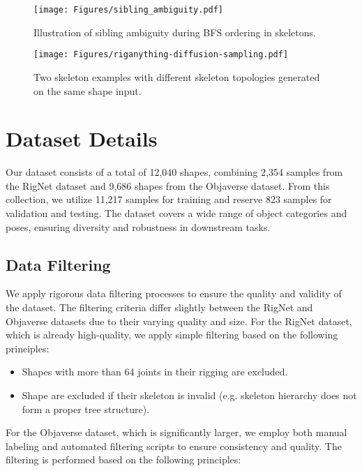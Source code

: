 \begin{figure}[h]
\texttt{[image: Figures/sibling\_ambiguity.pdf]}
\caption{Illustration of sibling ambiguity during BFS ordering in skeletons.}
\label{fig:sibling_ambiguity}
\end{figure}



\begin{figure}[h]
\texttt{[image: Figures/riganything-diffusion-sampling.pdf]}
\caption{Two skeleton examples with different skeleton topologies generated on the same shape input.}
\label{fig: diffusion_sampling}
\end{figure}

\section{Dataset Details}

Our dataset consists of a total of 12,040 shapes, combining 2,354 samples from the RigNet dataset and 9,686 shapes from the Objaverse dataset. From this collection, we utilize 11,217 samples for training and reserve 823 samples for validation and testing. The dataset covers a wide range of object categories and poses, ensuring diversity and robustness in downstream tasks.

\subsection{Data Filtering}

We apply rigorous data filtering processes to ensure the quality and validity of the dataset. The filtering criteria differ slightly between the RigNet and Objaverse datasets due to their varying quality and size. For the RigNet dataset, which is already high-quality, we apply simple filtering based on the following principles:

\begin{itemize}
    \item Shapes with more than 64 joints in their rigging are excluded.
    \item Shape are excluded if their skeleton is invalid (e.g. skeleton hierarchy does not form a proper tree structure).
\end{itemize}

For the Objaverse dataset, which is significantly larger, we employ both manual labeling and automated filtering scripts to ensure consistency and quality. The filtering is performed based on the following principles:

